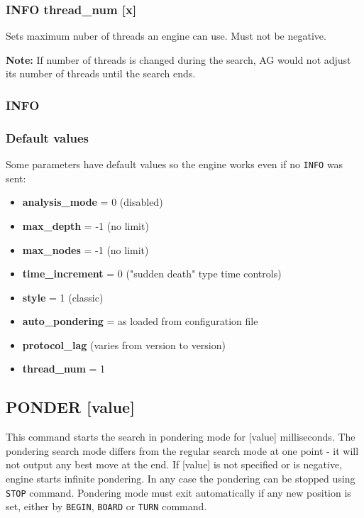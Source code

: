 \documentclass[12pt,a4paper]{article}
\begin{document}
\subsubsection{INFO thread{\_}num [x]}
Sets maximum nuber of threads an engine can use. Must not be negative.

\textbf{Note:} If number of threads is changed during the search, AG would not adjust its number of threads until the search ends.

\subsubsection{INFO }

\subsubsection{Default values}
Some parameters have default values so the engine works even if no \texttt{INFO} was sent:
\begin{itemize}
\item{\textbf{analysis{\_}mode} = 0 (disabled)}
\item{\textbf{max{\_}depth } = -1 (no limit)}
\item{\textbf{max{\_}nodes} = -1 (no limit)}
\item{\textbf{time{\_}increment} = 0 ("sudden death" \cite{suddendeath} type time controls)}
\item{\textbf{style} = 1 (classic)}
\item{\textbf{auto{\_}pondering} = as loaded from configuration file}
\item{\textbf{protocol{\_}lag}  (varies from version to version)}
\item{\textbf{thread{\_}num} = 1}
\end{itemize}


\subsection{PONDER [value]}
\label{cmd_ponder}
This command starts the search in pondering mode for [value] milliseconds. The pondering search mode differs from the regular search mode at one point - it will not output any best move at the end. If [value] is not specified or is negative, engine starts infinite pondering. In any case the pondering can be stopped using \texttt{STOP} command. Pondering mode must exit automatically if any new position is set, either by \texttt{BEGIN}, \texttt{BOARD} or \texttt{TURN} command.
\end{document}
